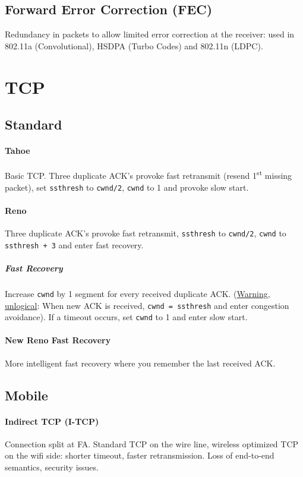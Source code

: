 \documentclass[10pt, a4paper,twocolumn]{scrartcl}
\begin{document}
\subsection{Forward Error Correction (FEC)}
Redundancy in packets to allow limited error correction at the receiver: used in 802.11a (Convolutional), HSDPA (Turbo Codes) and 802.11n (LDPC).

\section{TCP}

\subsection{Standard}

\paragraph{Tahoe} Basic TCP. Three duplicate ACK's provoke fast retransmit (resend 1\textsuperscript{st} missing packet), set \texttt{ssthresh} to \texttt{cwnd/2}, \texttt{cwnd} to 1 and provoke slow start.

\paragraph{Reno} Three duplicate ACK's provoke fast retransmit, \texttt{ssthresh} to \texttt{cwnd/2}, \texttt{cwnd} to \texttt{ssthresh + 3} and enter fast recovery.

\subparagraph{Fast Recovery} Increase \texttt{cwnd} by 1 segment for every received duplicate ACK. (\underline{Warning, unlogical}: When new ACK is received, \texttt{cwnd = ssthresh} and enter congestion avoidance). If a timeout occurs, set \texttt{cwnd} to 1 and enter slow start.
\paragraph{New Reno Fast Recovery} More intelligent fast recovery where you remember the last received ACK.

\subsection{Mobile}
\paragraph{Indirect TCP (I-TCP)} Connection split at FA. Standard TCP on the wire line, wireless optimized TCP on the wifi side: shorter timeout, faster retransmission. Loss of end-to-end semantics, security issues.
\end{document}
